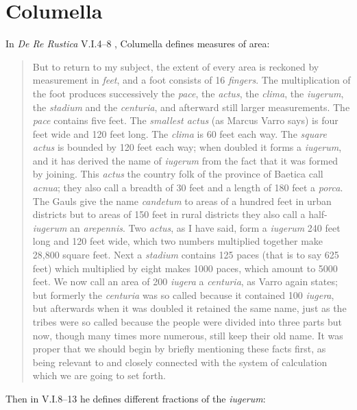 \documentclass{article}
\theoremstyle{definition}
\begin{document}
 





\section{Columella}
In {\em De Re Rustica} V.I.4--8 \cite[pp.~5--7]{columellaII}, Columella defines  measures of area:

\begin{quote}
But to return to my subject, the extent of every area is reckoned by measurement in {\em feet}, and a foot consists of 16 {\em fingers}. The multiplication of the foot produces 
successively the {\em pace}, the {\em actus}, the {\em clima}, the {\em iugerum}, the {\em stadium} and the {\em centuria}, and afterward still larger measurements. The {\em pace} 
contains five feet. The {\em smallest actus} (as Marcus Varro says) is four feet wide and 120 feet long. The {\em clima} is 60 feet each way. The {\em square actus} is bounded by
120 feet each way; when doubled it forms a {\em iugerum}, and it has derived the name of {\em iugerum} from the fact that it was formed by joining. This {\em actus} the country folk
of the province of Baetica call {\em acnua}; they also call a breadth of 30 feet and a length of 180 feet a {\em porca}. The Gauls give the name  {\em candetum} to areas of a
hundred feet in urban districts but to areas of 150 feet in rural districts they also call a half-{\em iugerum} an {\em arepennis}. Two {\em actus}, as I have said, form a {\em iugerum} 
240 feet long and 120 feet wide, which two numbers multiplied together make 28,800 square feet. Next a {\em stadium} contains 125 paces (that is to say 625 feet) which
multiplied by eight makes 1000 paces, which amount to 5000 feet. We now call an area of 200 {\em iugera} a {\em centuria}, as Varro again states; but formerly the {\em centuria}
was so called because it contained 100 {\em iugera}, but afterwards when it was doubled it retained the same name, just as the tribes were so called because the people were 
divided into three parts but now, though many times more numerous, still keep their old name. It was proper that we should begin by briefly mentioning these facts first, as being 
relevant to and closely connected with the system of calculation which we are going to set forth.
\end{quote}

Then in V.I.8--13 \cite[pp.~9--13]{columellaII} he defines different fractions of the {\em iugerum}:
\end{document}
